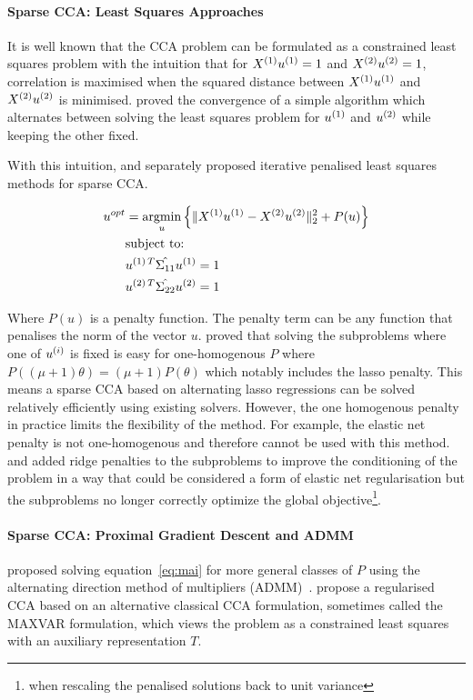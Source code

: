\paragraph{Sparse CCA: Least Squares Approaches}

It is well known that the CCA problem can be formulated as a constrained least squares problem with the intuition that
for \(X^{(1)} u^{(1)}=1\) and \(X^{(2)} u^{(2)}=1\), correlation is maximised when the squared distance
between \(X^{(1)} u^{(1)}\) and \(X^{(2)} u^{(2)}\) is minimised. \citep{golub1995canonical} proved the
convergence of a simple algorithm which alternates between solving the least squares problem for \(u^{(1)}\) and
\(u^{(2)}\) while keeping the other fixed.

With this intuition, \cite{wilms2015sparse} and \cite{mai2019iterative} separately proposed iterative penalised least
squares methods for sparse CCA\@.

\begin{align}
    \label{eq:mai}
    u^{opt} &= \underset{u}{\mathrm{argmin}} \left\{ \|X^{(1)}u^{(1)} - X^{(2)}u^{(2)}\|_2^2 + P(u) \right\} \\
    &\text{subject to:} \notag \\
    &u^{(1)\,T} \hat{\Sigma_{11}} u^{(1)}=1 \notag \\
    &u^{(2)\,T} \hat{\Sigma_{22}} u^{(2)}=1 \notag
\end{align}

Where \(P(u)\) is a penalty function.
The penalty term can be any function that penalises the norm of the vector \(u\).
\citep{mai2019iterative} proved that solving the subproblems where one of $u^{(i)}$ is fixed is easy for one-homogenous $P$ where
\( P((\mu + 1)\theta) = (\mu + 1)P(\theta) \) which notably includes the lasso penalty.
This means a sparse CCA based
on alternating lasso regressions can be solved relatively efficiently using existing solvers.
However, the one homogenous penalty in practice limits the flexibility of the method.
For example, the elastic net penalty is not one-homogenous and therefore cannot be used with this method.
\citet{6556581} and \cite{Mullins2021} added ridge penalties to the subproblems to improve the conditioning of the problem in a way that could be considered a form of elastic net regularisation but the subproblems no longer correctly optimize the global objective\footnote{when rescaling the penalised solutions back to unit variance}.

\paragraph{Sparse CCA: Proximal Gradient Descent and ADMM}
\citet{kanatsoulis2018structured} proposed solving equation~\ref{eq:mai} for more general classes of $P$ using the alternating direction method of multipliers (ADMM)~\citep{boyd2011distributed}.
\cite{fu2017scalable} propose a regularised CCA based on an alternative classical CCA formulation, sometimes called the MAXVAR formulation, which views the problem as a constrained least squares with an auxiliary representation $T$\citep{carroll1968generalisation,kettenring1971canonical}.


